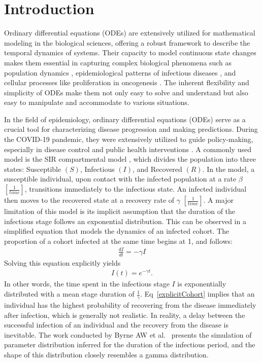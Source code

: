 \documentclass[12pt]{article}
\newcommand{\Eqnref}[1]{Eq~\ref{#1}}
\begin{document}
\section{Introduction}
Ordinary differential equations (ODEs) are extensively utilized for mathematical modeling in the biological sciences, offering a robust framework to describe the temporal dynamics of systems. Their capacity to model continuous state changes makes them essential in capturing complex biological phenomena such as population dynamics \cite{salisbury2011mathematical}\cite{sego2021generation}, epidemiological patterns of infectious diseases \cite{Anderson1991}\cite{Diekmann2000}\cite{Feng2016}, and cellular processes like proliferation in oncogenesis \cite{baker1998modelling}\cite{jarrett2018mathematical}. The inherent flexibility and simplicity of ODEs make them not only easy to solve and understand but also easy to manipulate and accommodate to various situations.

In the field of epidemiology, ordinary differential equations (ODEs) serve as a crucial tool for characterizing disease progression and making predictions. During the COVID-19 pandemic, they were extensively utilized to guide policy-making, especially in disease control and public health interventions \cite{thompson2020epidemiological}. A commonly used model is the SIR compartmental model \cite{Anderson1991}\cite{kermack1927contribution}, which divides the population into three states: Susceptible $(S)$, Infectious $(I)$, and Recovered $(R)$. In the model, a susceptible individual, upon contact with the infected population at a rate $\beta$ $[\frac{1}{\mathit{ time}}]$, transitions immediately to the infectious state. An infected individual then moves to the recovered state at a recovery rate of $\gamma$ $[\frac{1}{\mathit{time}}]$. A major limitation of this model is its implicit assumption that the duration of the infectious stage follows an exponential distribution. This can be observed in a simplified equation that models the dynamics of an infected cohort. The proportion of a cohort infected at the same time begins at 1, and follows:
\begin{align}
    \frac{dI}{dt} = -\gamma I
\end{align}
Solving this equation explicitly yields
\begin{align}
    I(t) = e^{-\gamma t}.
	 \label{explicitCohort}
\end{align}
In other words, the time spent in the infectious stage $I$ is exponentially distributed with a mean stage duration of $\frac{1}{\gamma}$.
\Eqnref{explicitCohort} implies that an individual has the highest probability of recovering from the disease immediately after infection, which is generally not realistic. In reality, a delay between the successful infection of an individual and the recovery from the disease is inevitable. The work conducted by Byrne AW et al.~\cite{byrne2020inferred} presents the simulation of parameter distribution inferred for the duration of the infectious period, and the shape of this distribution closely resembles a gamma distribution.
\end{document}
